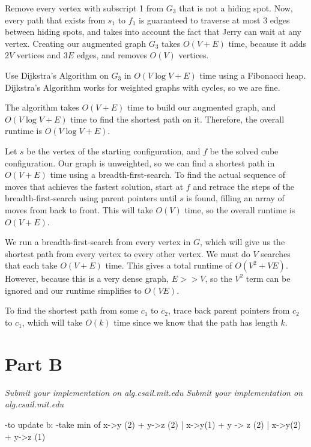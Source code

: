 \documentclass[12pt,twoside]{article}
\begin{document}
\begin{problems}
\begin{problemparts}
Remove every vertex with subscript 1 from $G_3$ that is not a hiding spot. Now, every path that exists from $s_1$ to $f_1$ is guaranteed to traverse at most 3 edges between hiding spots, and takes into account the fact that Jerry can wait at any vertex. Creating our augmented graph $G_3$ takes $O(V+E)$ time, because it adds $2V$ vertices and $3E$ edges, and removes $O(V)$ vertices.

Use Dijkstra's Algorithm on $G_3$ in $O(V\log V + E)$ time using a Fibonacci heap. Dijkstra's Algorithm works for weighted graphs with cycles, so we are fine.

The algorithm takes $O(V + E)$ time to build our augmented graph, and $O(V\log V + E)$ time to find the shortest path on it. Therefore, the overall runtime is $O(V\log V + E)$.

\end{problemparts}

\problem  %

\begin{problemparts}
\problempart Let $s$ be the vertex of the starting configuration, and $f$ be the solved cube configuration. Our graph is unweighted, so we can find a shortest path in $O(V + E)$ time using a breadth-first-search. To find the actual sequence of moves that achieves the fastest solution, start at $f$ and retrace the steps of the breadth-first-search using parent pointers until $s$ is found, filling an array of moves from back to front. This will take $O(V)$ time, so the overall runtime is $O(V+E)$.


\problempart We run a breadth-first-search from every vertex in $G$, which will give us the shortest path from every vertex to every other vertex. We must do $V$ searches that each take $O(V+E)$ time. This gives a total runtime of $O(V^2 + VE)$. However, because this is a very dense graph, $E >> V$, so the $V^2$ term can be ignored and our runtime simplifies to $O(VE)$.

To find the shortest path from some $c_1$ to $c_2$, trace back parent pointers from $c_2$ to $c_1$, which will take $O(k)$ time since we know that the path has length $k$.

\end{problemparts}

\section*{Part B}

\problem
\begin{problemparts}
\problempart \emph{Submit your implementation on alg.csail.mit.edu}
\problempart \emph{Submit your implementation on alg.csail.mit.edu}

-to update b:
	-take min of x->y (2) + y->z (2)     |          x->y(1) + y -> z (2)     | x->y(2)  + y->z (1)



\end{problemparts}

\end{problems}
\end{document}
